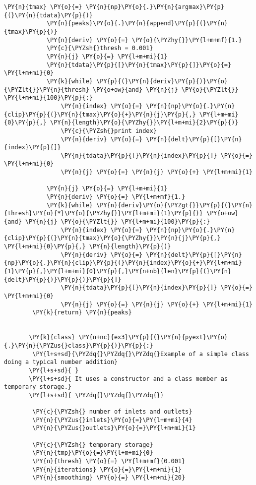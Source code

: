\begin{Verbatim}[commandchars=\\\{\}]
       		\PY{n}{tmax} \PY{o}{=} \PY{n}{np}\PY{o}{.}\PY{n}{argmax}\PY{p}{(}\PY{n}{tdata}\PY{p}{)}
       		\PY{n}{peaks}\PY{o}{.}\PY{n}{append}\PY{p}{(}\PY{n}{tmax}\PY{p}{)}
       		\PY{n}{deriv} \PY{o}{=} \PY{o}{\PYZhy{}}\PY{l+m+mf}{1.}
       		\PY{c}{\PYZsh{}thresh = 0.001}
       		\PY{n}{j} \PY{o}{=} \PY{l+m+mi}{1}
       		\PY{n}{tdata}\PY{p}{[}\PY{n}{tmax}\PY{p}{]}\PY{o}{=} \PY{l+m+mi}{0}
       		\PY{k}{while} \PY{p}{(}\PY{n}{deriv}\PY{p}{)}\PY{o}{\PYZlt{}}\PY{n}{thresh} \PY{o+ow}{and} \PY{n}{j} \PY{o}{\PYZlt{}} \PY{l+m+mi}{100}\PY{p}{:}
       			\PY{n}{index} \PY{o}{=} \PY{n}{np}\PY{o}{.}\PY{n}{clip}\PY{p}{(}\PY{n}{tmax}\PY{o}{+}\PY{n}{j}\PY{p}{,} \PY{l+m+mi}{0}\PY{p}{,} \PY{n}{length}\PY{o}{\PYZhy{}}\PY{l+m+mi}{2}\PY{p}{)}
       			\PY{c}{\PYZsh{}print index}
       			\PY{n}{deriv} \PY{o}{=} \PY{n}{delt}\PY{p}{[}\PY{n}{index}\PY{p}{]}
       			\PY{n}{tdata}\PY{p}{[}\PY{n}{index}\PY{p}{]} \PY{o}{=} \PY{l+m+mi}{0}
       			\PY{n}{j} \PY{o}{=} \PY{n}{j} \PY{o}{+} \PY{l+m+mi}{1} 
       		
       		\PY{n}{j} \PY{o}{=} \PY{l+m+mi}{1}
       		\PY{n}{deriv} \PY{o}{=} \PY{l+m+mf}{1.}
       		\PY{k}{while} \PY{n}{deriv}\PY{o}{\PYZgt{}}\PY{p}{(}\PY{n}{thresh}\PY{o}{*}\PY{o}{\PYZhy{}}\PY{l+m+mi}{1}\PY{p}{)} \PY{o+ow}{and} \PY{n}{j} \PY{o}{\PYZlt{}} \PY{l+m+mi}{100}\PY{p}{:}
       			\PY{n}{index} \PY{o}{=} \PY{n}{np}\PY{o}{.}\PY{n}{clip}\PY{p}{(}\PY{n}{tmax}\PY{o}{\PYZhy{}}\PY{n}{j}\PY{p}{,} \PY{l+m+mi}{0}\PY{p}{,} \PY{n}{length}\PY{p}{)}
       			\PY{n}{deriv} \PY{o}{=} \PY{n}{delt}\PY{p}{[}\PY{n}{np}\PY{o}{.}\PY{n}{clip}\PY{p}{(}\PY{n}{index}\PY{o}{+}\PY{l+m+mi}{1}\PY{p}{,}\PY{l+m+mi}{0}\PY{p}{,}\PY{n+nb}{len}\PY{p}{(}\PY{n}{delt}\PY{p}{)}\PY{p}{)}\PY{p}{]}
       			\PY{n}{tdata}\PY{p}{[}\PY{n}{index}\PY{p}{]} \PY{o}{=} \PY{l+m+mi}{0}
       			\PY{n}{j} \PY{o}{=} \PY{n}{j} \PY{o}{+} \PY{l+m+mi}{1}
       	\PY{k}{return} \PY{n}{peaks}
       
       
       \PY{k}{class} \PY{n+nc}{ex3}\PY{p}{(}\PY{n}{pyext}\PY{o}{.}\PY{n}{\PYZus{}class}\PY{p}{)}\PY{p}{:}
       	\PY{l+s+sd}{\PYZdq{}\PYZdq{}\PYZdq{}Example of a simple class doing a typical number addition}
       \PY{l+s+sd}{	}
       \PY{l+s+sd}{	It uses a constructor and a class member as temporary storage.}
       \PY{l+s+sd}{	\PYZdq{}\PYZdq{}\PYZdq{}}
       
       	\PY{c}{\PYZsh{} number of inlets and outlets}
       	\PY{n}{\PYZus{}inlets}\PY{o}{=}\PY{l+m+mi}{4}
       	\PY{n}{\PYZus{}outlets}\PY{o}{=}\PY{l+m+mi}{1}
       
       	\PY{c}{\PYZsh{} temporary storage}
       	\PY{n}{tmp}\PY{o}{=}\PY{l+m+mi}{0}
       	\PY{n}{thresh} \PY{o}{=} \PY{l+m+mf}{0.001}
       	\PY{n}{iterations} \PY{o}{=}\PY{l+m+mi}{1}
       	\PY{n}{smoothing} \PY{o}{=} \PY{l+m+mi}{20}
       

\end{Verbatim}
